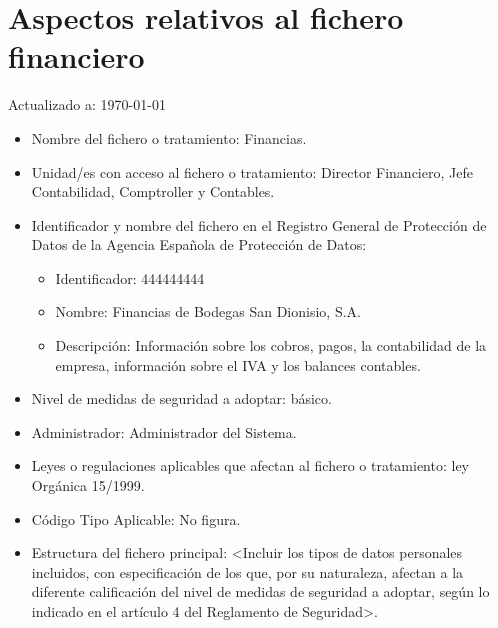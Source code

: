 \documentclass[a4paper,11pt,bibtotoc,noliststotoc]{scrbook}
\newcommand{\laorganizacion}{Bodegas San Dionisio, S.A.}
\begin{document}
\section{Aspectos relativos al fichero financiero}


Actualizado a: \today

\begin{itemize}
\item Nombre del fichero o tratamiento: Financias.

\item Unidad/es con acceso al fichero o tratamiento: Director Financiero, Jefe Contabilidad, Comptroller y Contables.

\item Identificador y nombre del fichero en el Registro General de Protección de Datos de la Agencia Española de Protección de Datos: 
	\begin{itemize}
	\item Identificador: 444444444
	\item Nombre: Financias de \laorganizacion
	\item Descripción: Información sobre los cobros, pagos, la contabilidad de la empresa, información sobre el IVA y los balances contables.
	\end{itemize}

\item Nivel de medidas de seguridad a adoptar: básico.

\item Administrador: Administrador del Sistema.

\item Leyes o regulaciones aplicables que afectan al fichero o tratamiento: ley Orgánica 15/1999.

\item Código Tipo Aplicable: No figura.

\item Estructura del fichero principal: <Incluir los tipos de datos personales incluidos, con especificación de los que, por su naturaleza, afectan a la diferente calificación del nivel de medidas de seguridad a adoptar, según lo indicado en el artículo 4 del Reglamento de Seguridad>.


\end{itemize}
\end{document}
